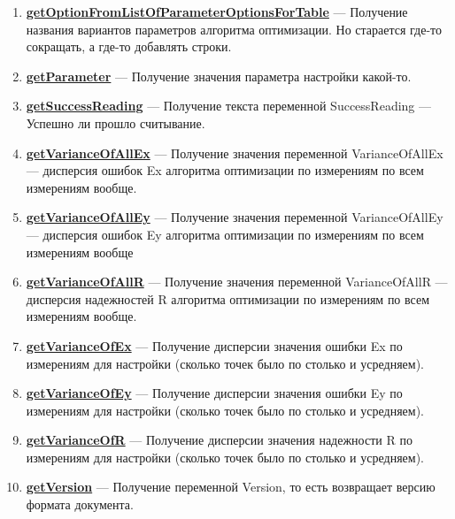 \documentclass[a4paper,12pt]{article}
\begin{document}
\begin{enumerate}
\item \textbf{\hyperref[getOptionFromListOfParameterOptionsForTable]{getOptionFromListOfParameterOptionsForTable}} --- Получение названия вариантов параметров алгоритма оптимизации. Но старается где-то сокращать, а где-то добавлять строки.

\item \textbf{\hyperref[getParameter]{getParameter}} --- Получение значения параметра настройки какой-то.

\item \textbf{\hyperref[getSuccessReading]{getSuccessReading}} --- Получение текста переменной SuccessReading --- Успешно ли прошло считывание.

\item \textbf{\hyperref[getVarianceOfAllEx]{getVarianceOfAllEx}} --- Получение значения переменной VarianceOfAllEx --- дисперсия ошибок Ex алгоритма оптимизации по измерениям по всем измерениям вообще.

\item \textbf{\hyperref[getVarianceOfAllEy]{getVarianceOfAllEy}} --- Получение значения переменной VarianceOfAllEy --- дисперсия ошибок Ey алгоритма оптимизации по измерениям по всем измерениям вообще

\item \textbf{\hyperref[getVarianceOfAllR]{getVarianceOfAllR}} --- Получение значения переменной VarianceOfAllR --- дисперсия надежностей R алгоритма оптимизации по измерениям по всем измерениям вообще.

\item \textbf{\hyperref[getVarianceOfEx]{getVarianceOfEx}} --- Получение дисперсии значения ошибки Ex по измерениям для настройки (сколько точек было по столько и усредняем).

\item \textbf{\hyperref[getVarianceOfEy]{getVarianceOfEy}} --- Получение дисперсии значения ошибки Ey по измерениям для настройки (сколько точек было по столько и усредняем).

\item \textbf{\hyperref[getVarianceOfR]{getVarianceOfR}} --- Получение дисперсии значения надежности R по измерениям для настройки (сколько точек было по столько и усредняем).

\item \textbf{\hyperref[getVersion]{getVersion}} --- Получение переменной Version, то есть возвращает версию формата документа.

\end{enumerate}
\end{document}
